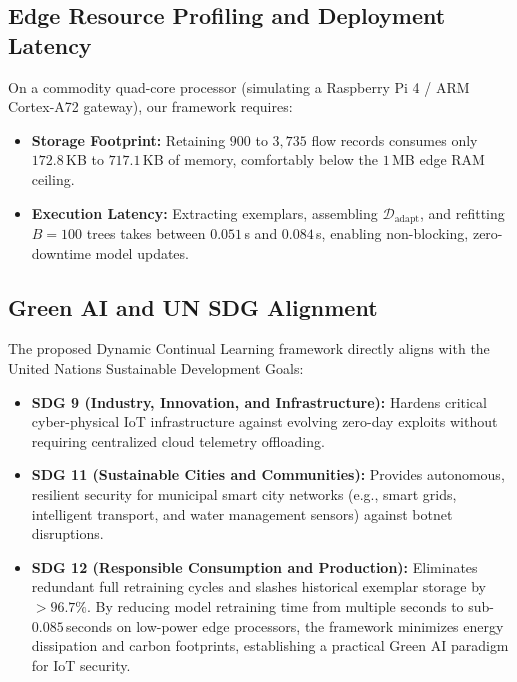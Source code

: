 \documentclass[conference]{IEEEtran}
\begin{document}
\subsection{Edge Resource Profiling and Deployment Latency}
On a commodity quad-core processor (simulating a Raspberry Pi 4 / ARM Cortex-A72 gateway), our framework requires:
\begin{itemize}
    \item \textbf{Storage Footprint:} Retaining $900$ to $3{,}735$ flow records consumes only $172.8$\,KB to $717.1$\,KB of memory, comfortably below the $1$\,MB edge RAM ceiling.
    \item \textbf{Execution Latency:} Extracting exemplars, assembling $\mathcal{D}_{\text{adapt}}$, and refitting $B=100$ trees takes between $0.051$\,s and $0.084$\,s, enabling non-blocking, zero-downtime model updates.
\end{itemize}

\subsection{Green AI and UN SDG Alignment}
The proposed Dynamic Continual Learning framework directly aligns with the United Nations Sustainable Development Goals:
\begin{itemize}
    \item \textbf{SDG 9 (Industry, Innovation, and Infrastructure):} Hardens critical cyber-physical IoT infrastructure against evolving zero-day exploits without requiring centralized cloud telemetry offloading.
    \item \textbf{SDG 11 (Sustainable Cities and Communities):} Provides autonomous, resilient security for municipal smart city networks (e.g., smart grids, intelligent transport, and water management sensors) against botnet disruptions.
    \item \textbf{SDG 12 (Responsible Consumption and Production):} Eliminates redundant full retraining cycles and slashes historical exemplar storage by $>96.7\%$. By reducing model retraining time from multiple seconds to sub-$0.085$\,seconds on low-power edge processors, the framework minimizes energy dissipation and carbon footprints, establishing a practical Green AI paradigm for IoT security.
\end{itemize}

\end{document}
